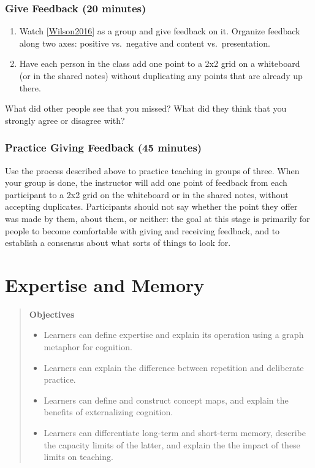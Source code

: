 \documentclass[10pt,statementpaper]{memoir}
\providecommand{\tightlist}{%
  \setlength{\itemsep}{0pt}\setlength{\parskip}{0pt}}
\begin{document}
\subsection{Give Feedback (20 minutes)}\label{give-feedback-20-minutes}

\begin{enumerate}
\def\labelenumi{\arabic{enumi}.}
\item
  Watch {[}\href{biblio.html\#wilson-bad-teaching-live}{Wilson2016}{]}
  as a group and give feedback on it. Organize feedback along two axes:
  positive vs.~negative and content vs.~presentation.
\item
  Have each person in the class add one point to a 2x2 grid on a
  whiteboard (or in the shared notes) without duplicating any points
  that are already up there.
\end{enumerate}

What did other people see that you missed? What did they think that you
strongly agree or disagree with?

\subsection{Practice Giving Feedback (45
minutes)}\label{practice-giving-feedback-45-minutes}

Use the process described above to practice teaching in groups of three.
When your group is done, the instructor will add one point of feedback
from each participant to a 2x2 grid on the whiteboard or in the shared
notes, without accepting duplicates. Participants should not say whether
the point they offer was made by them, about them, or neither: the goal
at this stage is primarily for people to become comfortable with giving
and receiving feedback, and to establish a consensus about what sorts of
things to look for.

\chapter{Expertise and Memory}\label{expertise-and-memory}

\begin{quote}
\textbf{Objectives}

\begin{itemize}
\tightlist
\item
  Learners can define expertise and explain its operation using a graph
  metaphor for cognition.
\item
  Learners can explain the difference between repetition and deliberate
  practice.
\item
  Learners can define and construct concept maps, and explain the
  benefits of externalizing cognition.
\item
  Learners can differentiate long-term and short-term memory, describe
  the capacity limits of the latter, and explain the the impact of these
  limits on teaching.
\end{itemize}
\end{quote}
\end{document}
